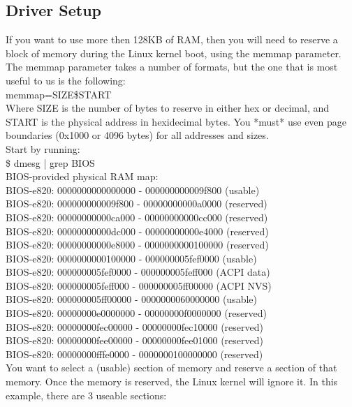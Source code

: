 \subsection*{Driver Setup}
\begin{flushleft}
If you want to use more then 128KB of RAM, then you will need to reserve a
block of memory during the Linux kernel boot, using the memmap parameter.  The
memmap parameter takes a number of formats, but the one that is most useful to
us is the following: \\

	memmap=SIZE\$START \\

Where SIZE is the number of bytes to reserve in either hex or decimal, and
START is the physical address in hexidecimal bytes.  You *must* use even
page boundaries (0x1000 or 4096 bytes) for all addresses and sizes. \\

Start by running: \\

\$ dmesg | grep BIOS \\
BIOS-provided physical RAM map: \\
 BIOS-e820: 0000000000000000 - 000000000009f800 (usable)\\
 BIOS-e820: 000000000009f800 - 00000000000a0000 (reserved)\\
 BIOS-e820: 00000000000ca000 - 00000000000cc000 (reserved)\\
 BIOS-e820: 00000000000dc000 - 00000000000e4000 (reserved)\\
 BIOS-e820: 00000000000e8000 - 0000000000100000 (reserved)\\
 BIOS-e820: 0000000000100000 - 000000005fef0000 (usable)\\
 BIOS-e820: 000000005fef0000 - 000000005feff000 (ACPI data)\\
 BIOS-e820: 000000005feff000 - 000000005ff00000 (ACPI NVS)\\
 BIOS-e820: 000000005ff00000 - 0000000060000000 (usable)\\
 BIOS-e820: 00000000e0000000 - 00000000f0000000 (reserved)\\
 BIOS-e820: 00000000fec00000 - 00000000fec10000 (reserved)\\
 BIOS-e820: 00000000fee00000 - 00000000fee01000 (reserved)\\
 BIOS-e820: 00000000fffe0000 - 0000000100000000 (reserved)\\

 You want to select a (usable) section of memory and reserve a section of that
 memory.  Once the memory is reserved, the Linux kernel will ignore it.  In
 this example, there are 3 useable sections:\\


\end{flushleft}

